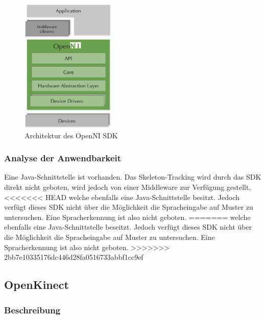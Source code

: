 \begin{figure}[!]
\centering
\includegraphics[width=0.4\textwidth]{img/04kapitel/OpenNI2_Architecture2.png}
\caption[Kinect Explorer]{Architektur des OpenNI SDK\footnotemark[8]}
\label{fig:opennisdk}
\end{figure}

\subsubsection{Analyse der Anwendbarkeit}

Eine Java-Schnittstelle ist vorhanden. Das Skeleton-Tracking wird durch das SDK direkt nicht geboten, wird jedoch von einer Middleware zur Verf\"ugung gestellt, 
<<<<<<< HEAD
welche ebenfalls eine Java-Schnittstelle besitzt. Jedoch verf\"ugt dieses SDK nicht \"uber die M\"oglichkeit die Spracheingabe auf Muster zu untersuchen. Eine Spracherkennung ist also nicht geboten.
=======
welche ebenfalls eine Java-Schnittstelle beseitzt. Jedoch verf\"ugt dieses SDK nicht \"uber die M\"oglichkeit die Spracheingabe auf Muster zu untersuchen. Eine Spracherkennung ist also nicht geboten.
>>>>>>> 2bb7e10335176dc446d28fa0516733abbf1cc9ef

\newpage

\subsection{OpenKinect}

\subsubsection{Beschreibung}

